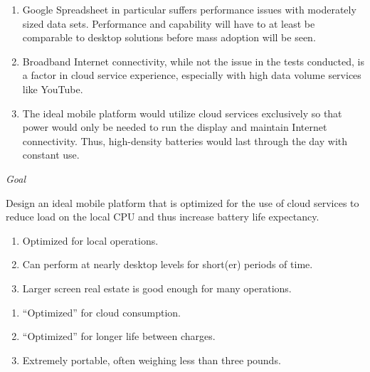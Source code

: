 \documentclass[letterpaper]{article}
\begin{document}
{\begin{center}
\begin{enumerate}
\item Google Spreadsheet in particular suffers performance issues with
  moderately sized data sets.  Performance and capability will have to at least
  be comparable to desktop solutions before mass adoption will be seen.

\item Broadband Internet connectivity, while not the issue in the tests
  conducted, is a factor in cloud service experience, especially with high data
  volume services like YouTube.

\item The ideal mobile platform would utilize cloud services exclusively so that
  power would only be needed to run the display and maintain Internet
  connectivity.  Thus, high-density batteries would last through the day with
  constant use.

\end{enumerate}

\newpage


\emph{Goal}

\end{center}

Design an ideal mobile platform that is optimized for the use of cloud services
to reduce load on the local CPU and thus increase battery life expectancy.

\begin{enumerate}

\item Optimized for local operations.

\item Can perform at nearly desktop levels for short(er) periods of time.

\item Larger screen real estate is good enough for many operations.

\end{enumerate}

\begin{enumerate}


\item ``Optimized'' for cloud consumption.

\item ``Optimized'' for longer life between charges.

\item Extremely portable, often weighing less than three pounds.


\end{enumerate}}
\end{document}
